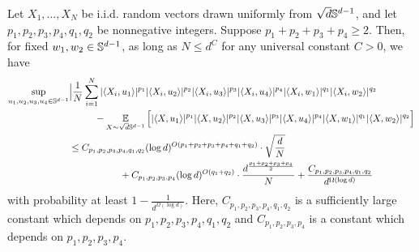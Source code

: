 \begin{lemma}\label{lemma:uniform_convergence_two_sup}
Let $X_1, \ldots, X_N$ be i.i.d. random vectors drawn uniformly from $\sqrt{d} \mathbb{S}^{d - 1}$, and let $p_1, p_2, p_3, p_4, q_1, q_2$ be nonnegative integers. Suppose $p_1 + p_2 + p_3 + p_4 \geq 2$. Then, for fixed $w_1, w_2 \in \mathbb{S}^{d - 1}$, as long as $N \leq d^C$ for any universal constant $C > 0$, we have
\begin{align}
\sup_{u_1, u_2, u_3, u_4 \in \mathbb{S}^{d - 1}} & \Big|\frac{1}{N} \sum_{i = 1}^N |\langle X_i, u_1 \rangle|^{p_1} |\langle X_i, u_2 \rangle|^{p_2} |\langle X_i, u_3 \rangle|^{p_3} |\langle X_i, u_4 \rangle|^{p_4} |\langle X_i, w_1 \rangle|^{q_1} |\langle X_i, w_2 \rangle|^{q_2} \\
& \,\,\,\,\,\,\,\,\,\,\,\,\,\,\,\, - \operatorname*{\mathbb{E}}_{X \sim \sqrt{d} \mathbb{S}^{d - 1}} \Big[|\langle X, u_1 \rangle|^{p_1} |\langle X, u_2 \rangle|^{p_2} |\langle X, u_3 \rangle|^{p_3} |\langle X, u_4 \rangle|^{p_4} |\langle X, w_1 \rangle|^{q_1} |\langle X, w_2 \rangle|^{q_2} \Big] \\
& \leq C_{p_1, p_2, p_3, p_4, q_1, q_2} (\log d)^{O(p_1 + p_2 + p_3 + p_4 + q_1 + q_2)} \cdot \sqrt{\frac{d}{N}} \\
& \,\,\,\,\,\,\,\,\,\,\,\,\,\,\,\,\,\,\,\,\,\,\,\,\,\,\,\,\,\,\,\, + C_{p_1, p_2, p_3, p_4} (\log d)^{O(q_1 + q_2)} \cdot \frac{d^{\frac{p_1 + p_2 + p_3 + p_4}{2}}}{N} + \frac{C_{p_1, p_2, p_3, p_4, q_1, q_2}}{d^{\Omega(\log d)}}
\end{align}
with probability at least $1 - \frac{1}{d^{\Omega(\log d)}}$. Here, $C_{p_1, p_2, p_3, p_4, q_1, q_2}$ is a sufficiently large constant which depends on $p_1, p_2, p_3, p_4, q_1, q_2$ and $C_{p_1, p_2, p_3, p_4}$ is a constant which depends on $p_1, p_2, p_3, p_4$.
\end{lemma}

